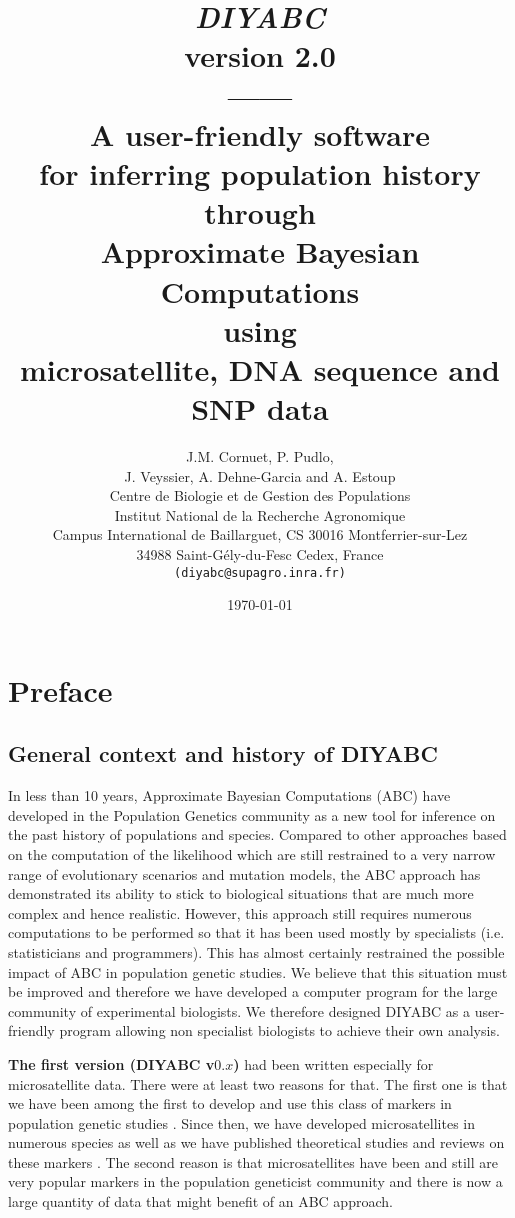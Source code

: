 \documentclass [a4paper]{report}
\title{\Huge \emph{\textbf{DIYABC}} \\ 
version 2.0\\
------\\ 
A user-friendly software \\  
for inferring population history  through \\ 
Approximate Bayesian Computations\\
using\\ 
microsatellite, DNA sequence and SNP data}
\author{
\Large J.M. Cornuet, P. Pudlo,\\ 
\Large J. Veyssier, A. Dehne-Garcia and A. Estoup\\
\vspace{6.0cm}
Centre de Biologie et de Gestion des Populations\\
Institut National de la Recherche Agronomique\\
Campus International de Baillarguet, CS 30016 Montferrier-sur-Lez\\
34988 Saint-G\'ely-du-Fesc Cedex, France\\
\texttt{(diyabc@supagro.inra.fr)}}
\date{\today}
\let\sectionv\section
\renewcommand{\section}[1]{\sectionv{#1} \setcounter{paragraph}{0}}
\let\subsectionv\subsection
\renewcommand{\subsection}[1]{\subsectionv{#1} \setcounter{paragraph}{0}}
\begin{document}
\maketitle %
\pagestyle{myheadings}
\begin{doublespacing}
\setcounter{tocdepth}{4}
\tableofcontents
\end{doublespacing}
\newpage
\section{Preface}
\subsection{General context and history of DIYABC}
In less than 10 years, Approximate Bayesian Computations (ABC) have developed in the Population Genetics community as a new tool for inference on the past history of populations and species. Compared to other approaches based on the computation of the likelihood which are still restrained to a very narrow range of evolutionary scenarios and mutation models, the ABC approach has demonstrated its ability to stick to biological situations that are much more complex and hence realistic. However, this approach still requires numerous computations to be performed so that it has been used mostly by specialists (i.e. statisticians and programmers). This has almost certainly restrained the possible impact of ABC in population genetic studies. We believe that this situation must be improved and therefore we have developed a computer program for the large community of experimental biologists. We therefore designed DIYABC as a user-friendly program allowing non specialist biologists to achieve their own analysis.\

\textbf{The first version (DIYABC v$0.x$)} had been written especially for microsatellite data. There were at least two reasons for that. The first one is that we have been among the first to develop and use this class of markers in population genetic studies \citep[e.g.][]{E1993}. Since then, we have developed microsatellites in numerous species as well as we have published theoretical studies and reviews on these markers \citep[e.g.][]{E2002}. The second reason is that microsatellites have been and still are very popular markers in the population geneticist community and there is now a large quantity of data that might benefit of an ABC approach.\
\end{document}

